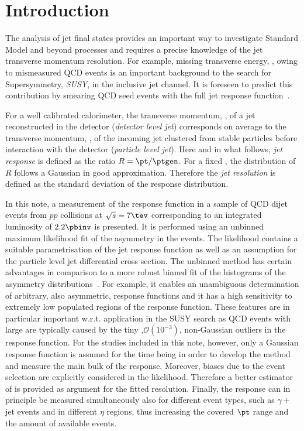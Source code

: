 

\section{Introduction}

The analysis of jet final states provides an important way to investigate Standard Model and beyond processes and requires a precise knowledge of the jet transverse momentum resolution.
For example, missing transverse energy, \met, owing to mismeasured QCD events is an important background to the search for Supersymmetry, \textit{SUSY}, in the inclusive jet channel.
It is foreseen to predict this contribution by smearing QCD seed events with the full jet response function~\cite{bib:ra2}.

For a well calibrated calorimeter, the transverse momentum, \pt, of a jet reconstructed in the detector (\textit{detector level jet}) corresponds on average to the transverse momentum, \ptgen, of the incoming jet clustered from stable particles before interaction with the detector (\textit{particle level jet}).
Here and in what follows, \textit{jet \pt response} is defined as the ratio \mbox{$R = \pt/\ptgen$}.
For a fixed \ptgen, the distribution of $R$ follows a Gaussian in good approximation.
Therefore the \textit{jet \pt resolution} is defined as the standard deviation of the response distribution. 

In this note, a measurement of the response function in a sample of QCD dijet events from $pp$ collisions at \mbox{$\sqrt{s} = 7\tev$} corresponding to an integrated luminosity of $2.2\pbinv$ is presented.
It is performed using an unbinned maximum likelihood fit of the \pt asymmetry in the events.
The likelihood contains a suitable parametrisation of the jet \pt response function as well as an assumption for the particle level jet differential cross section.
The unbinned method has certain advantages in comparison to a more robust binned fit of the histograms of the asymmetry distributions~\cite{bib:asym}.
For example, it enables an unambiguous determination of arbitrary, also asymmetric, response functions and it has a high sensitivity to extremely low populated regions of the response function.
These features are in particular important w.r.t. application in the SUSY search as QCD events with large \met are typically caused by the tiny ,$\mathcal{O}(10^{-3})$, non-Gaussian outliers in the response function.
For the studies included in this note, however, only a Gaussian response function is assumed for the time being in order to develop the method and measure the main bulk of the response.
Moreover, biases due to the event selection are explicitly considered in the likelihood.
Therefore a better estimator of \ptgen is provided as argument for the fitted resolution.
Finally, the response can in principle be measured simultaneously also for different event types, such as $\gamma+$jet events and in different $\eta$ regions, thus increasing the covered $\pt$ range and the amount of available events.

